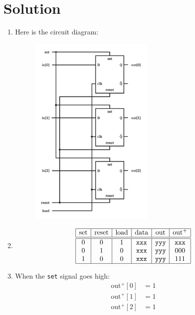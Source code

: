 \documentclass{article}
\begin{document}
    \section*{Solution}

    \begin{enumerate}
        \item {
            Here is the circuit diagram:

            \begin{figure}[h]
                \includegraphics[width=6cm]{diagram.png}
            \end{figure}
        }
        \item {
            \begin{displaymath}
                \begin{array}{| c | c | c | c | c | c | c |}
                    \hline
                    \text{set} & \text{reset} & \text{load} & \text{data} & \text{out} & \text{out}^+ \\
                    \hline \hline
                    0 & 0 & 1 & \texttt{xxx} & \texttt{yyy} & \texttt{xxx} \\ 
                    0 & 1 & 0 & \texttt{xxx} & \texttt{yyy} & 000 \\
                    1 & 0 & 0 & \texttt{xxx} & \texttt{yyy} & 111 \\
                    \hline
                \end{array}
            \end{displaymath}
        }
        \item {
            When the \verb|set| signal goes high:
            \begin{displaymath}
                \begin{aligned}
                    \text{out}^+[0] &= 1 \\
                    \text{out}^+[1] &= 1 \\
                    \text{out}^+[2] &= 1
                \end{aligned}
            \end{displaymath}

}
\end{enumerate}
\end{document}
